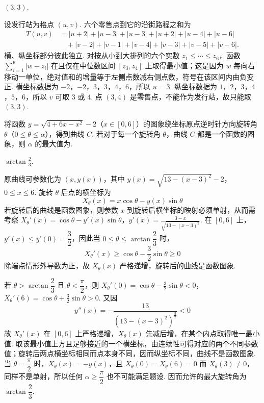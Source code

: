 \begin{answer}
\((3, 3)\).
\end{answer}

\begin{solution}
设发行站为格点 \((u,v)\). 六个零售点到它的沿街路程之和为
\[
\begin{aligned}
T(u,v)&=|u+2|+|u-3|+|u-3|+|u+2|+|u-4|+|u-6|\\
&\quad+|v-2|+|v-1|+|v-4|+|v-3|+|v-5|+|v-6|.
\end{aligned}
\]
横、纵坐标部分彼此独立. 对按从小到大排列的六个实数 \(z_1\leqslant\cdots\leqslant z_6\)，函数 \(\sum_{i=1}^6|w-z_i|\) 在且仅在中位数区间 \([z_3,z_4]\) 上取得最小值；这是因为 \(w\) 每向右移动一单位，绝对值和的增量等于左侧点数减右侧点数，符号在该区间内由负变正. 横坐标数据为 \(-2\)，\(-2\)，\(3\)，\(3\)，\(4\)，\(6\)，所以 \(u=3\). 纵坐标数据为 \(1\)，\(2\)，\(3\)，\(4\)，\(5\)，\(6\)，所以 \(v\) 可取 \(3\) 或 \(4\). 点 \((3,4)\) 是零售点，不能作为发行站，故只能取 \((3,3)\).
\end{solution}

\begin{problem}
将函数 \(y = \sqrt{4 + 6x - x^2} - 2\)（\(x \in [0, 6]\)）的图象绕坐标原点逆时针方向旋转角 \(\theta\)（\(0 \leqslant \theta \leqslant \alpha\)），得到曲线 \(C\). 若对于每一个旋转角 \(\theta\)，曲线 \(C\) 都是一个函数的图象，则 \(\alpha\) 的最大值为\fillinblank{}.
\end{problem}

\begin{answer}
\(\arctan\frac{2}{3}\).
\end{answer}

\begin{solution}
原曲线可参数化为 \((x,y(x))\)，其中
\(y(x)=\sqrt{13-(x-3)^2}-2\)，\(0\leqslant x\leqslant6\).
旋转 \(\theta\) 后点的横坐标为
\[
X_\theta(x)=x\cos\theta-y(x)\sin\theta
\]
若旋转后的曲线是函数图象，则参数 \(x\) 到旋转后横坐标的映射必须单射，从而需考察
\(X_\theta'(x)=\cos\theta-y'(x)\sin\theta\)，\(y'(x)=\frac{3-x}{\sqrt{13-(x-3)^2}}\).
在 \([0,6]\) 上，\(y'(x)\leqslant y'(0)=\dfrac32\)，因此当 \(0\leqslant\theta\leqslant\arctan\dfrac23\) 时，
\[
X_\theta'(x)\geqslant\cos\theta-\frac32\sin\theta\geqslant0
\]
除端点情形外导数为正，故 \(X_\theta(x)\) 严格递增，旋转后的曲线是函数图象.

若 \(\theta>\arctan\dfrac23\) 且 \(\theta<\dfrac\pi2\)，则
\(X_\theta'(0)=\cos\theta-\frac32\sin\theta<0\)，\(X_\theta'(6)=\cos\theta+\frac32\sin\theta>0\).
又因
\[
y''(x)=-\frac{13}{\left(13-(x-3)^2\right)^{\frac{3}{2}}}<0
\]
故 \(X_\theta'(x)\) 在 \([0,6]\) 上严格递增，\(X_\theta(x)\) 先减后增，在某个内点取得唯一最小值. 取该最小值上方且足够接近的一个横坐标，由连续性可得对应的两个不同参数值；旋转后两点横坐标相同而点本身不同，因而纵坐标不同，曲线不是函数图象. 当 \(\theta=\dfrac\pi2\) 时，\(X_\theta(x)=-y(x)\)，且 \(X_\theta(0)=X_\theta(6)=0\) 而 \(X_\theta(3)\neq0\)，同样不是单射，所以任何 \(\alpha\geqslant\dfrac\pi2\) 也不可能满足题设. 因而允许的最大旋转角为 \(\arctan\dfrac23\).
\end{solution}

